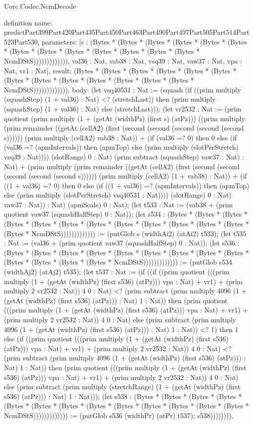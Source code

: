 \begin{lexlean}{Uorc.Codec.NcmDecode}
\begin{semanticmodule}
definition{
  name: predictPart399Part420Part435Part450Part463Part490Part497Part505Part514Part523Part530,
  parameters: [s : (Bytes * (Bytes * (Bytes * (Bytes * (Bytes * (Bytes * (Bytes * (Bytes * (Bytes * (Bytes * (Bytes * (Bytes * (Bytes * NcmDStS))))))))))))), val36 : Nat, vab38 : Nat, vsq39 : Nat, vaw37 : Nat, vpa : Nat, vr1 : Nat],
  result: (Bytes * (Bytes * (Bytes * (Bytes * (Bytes * (Bytes * (Bytes * (Bytes * (Bytes * (Bytes * (Bytes * (Bytes * (Bytes * NcmDStS))))))))))))),
  body: (let vsq40531 : Nat := (squash (if ((prim multiply (squashStep) (1 + val36) : Nat) <? (stretchLast)) then (prim multiply (squashStep) (1 + val36) : Nat) else (stretchLast))); (let vr2532 : Nat := (prim quotient (prim multiply (1 + (getAt (widthPz) (first s) (atPz))) ((prim multiply (prim remainder ((getAt (cellA2) (first (second (second (second (second (second s)))))) (prim multiply (cellA2) vab38 : Nat)) + (if (val36 =? 0) then 0 else (if (val36 =? (apmIntervals)) then (apmTop) else (prim multiply (slotPerStretch) vsq39 : Nat)))) (slotRange) 0 : Nat) (prim subtract (squashStep) vaw37 : Nat) : Nat) + (prim multiply (prim remainder ((getAt (cellA2) (first (second (second (second (second (second s)))))) (prim multiply (cellA2) (1 + vab38) : Nat)) + (if ((1 + val36) =? 0) then 0 else (if ((1 + val36) =? (apmIntervals)) then (apmTop) else (prim multiply (slotPerStretch) vsq40531 : Nat)))) (slotRange) 0 : Nat) vaw37 : Nat)) : Nat) (apmScale) 0 : Nat); (let t533 : Nat := (vab38 + (prim quotient vaw37 (squashHalfStep) 0 : Nat)); (let s534 : (Bytes * (Bytes * (Bytes * (Bytes * (Bytes * (Bytes * (Bytes * (Bytes * (Bytes * (Bytes * (Bytes * (Bytes * (Bytes * NcmDStS))))))))))))) := (putGlob s (widthAi2) (atAi2) t533); (let t535 : Nat := (val36 + (prim quotient vaw37 (squashHalfStep) 0 : Nat)); (let s536 : (Bytes * (Bytes * (Bytes * (Bytes * (Bytes * (Bytes * (Bytes * (Bytes * (Bytes * (Bytes * (Bytes * (Bytes * (Bytes * NcmDStS))))))))))))) := (putGlob s534 (widthAj2) (atAj2) t535); (let t537 : Nat := (if ((if ((prim quotient (((prim multiply (1 + (getAt (widthPz) (first s536) (atPz))) vpa : Nat) + vr1) + (prim multiply 2 vr2532 : Nat)) 4 0 : Nat) <? (prim subtract (prim multiply 4096 (1 + (getAt (widthPz) (first s536) (atPz))) : Nat) 1 : Nat)) then (prim quotient (((prim multiply (1 + (getAt (widthPz) (first s536) (atPz))) vpa : Nat) + vr1) + (prim multiply 2 vr2532 : Nat)) 4 0 : Nat) else (prim subtract (prim multiply 4096 (1 + (getAt (widthPz) (first s536) (atPz))) : Nat) 1 : Nat)) <? 1) then 1 else (if ((prim quotient (((prim multiply (1 + (getAt (widthPz) (first s536) (atPz))) vpa : Nat) + vr1) + (prim multiply 2 vr2532 : Nat)) 4 0 : Nat) <? (prim subtract (prim multiply 4096 (1 + (getAt (widthPz) (first s536) (atPz))) : Nat) 1 : Nat)) then (prim quotient (((prim multiply (1 + (getAt (widthPz) (first s536) (atPz))) vpa : Nat) + vr1) + (prim multiply 2 vr2532 : Nat)) 4 0 : Nat) else (prim subtract (prim multiply (stretchRange) (1 + (getAt (widthPz) (first s536) (atPz))) : Nat) 1 : Nat))); (let s538 : (Bytes * (Bytes * (Bytes * (Bytes * (Bytes * (Bytes * (Bytes * (Bytes * (Bytes * (Bytes * (Bytes * (Bytes * (Bytes * NcmDStS))))))))))))) := (putGlob s536 (widthPr) (atPr) t537); s538)))))))),
}
\end{semanticmodule}
\end{lexlean}
